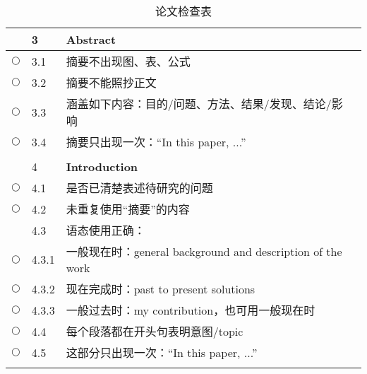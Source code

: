 \documentclass{ctexart}
\begin{document}
\begin{table}[h]
\begin{tabular}{|c|l|l|l|}
$ $ & 3 & \textcolor[rgb]{0.00,0.00,1.00}{\textbf{Abstract}}&\\\hline
$\bigcirc$ & 3.1 & 摘要不出现图、表、公式&\\\hline
$\bigcirc$ & 3.2 & 摘要不能照抄正文&\\\hline
$\bigcirc$ & 3.3 & 涵盖如下内容：目的/问题、方法、结果/发现、结论/影响&\\\hline
$\bigcirc$ & 3.4 & 摘要只出现一次：“In this paper, ...”&\\\hline
$ $&  &  &\\\hline

 & 4 & \textcolor[rgb]{0.00,0.00,1.00}{\textbf{Introduction}}&\\\hline
$\bigcirc$& 4.1 & 是否已清楚表述待研究的问题 &\\\hline
$\bigcirc$& 4.2 & 未重复使用“摘要”的内容 &\\\hline
$ $& 4.3 & 语态使用正确： &\\\hline
$\bigcirc$& 4.3.1 & 一般现在时：general background and description of the work &\\\hline
$\bigcirc$& 4.3.2 & 现在完成时：past to present solutions&\\\hline
$\bigcirc$& 4.3.3 & 一般过去时：my contribution，也可用一般现在时&\\\hline
$\bigcirc$& 4.4 & 每个段落都在开头句表明意图/topic &\\\hline
$\bigcirc$& 4.5 & 这部分只出现一次：“In this paper, ...” &\\\hline
$ $&  &  &\\\hline
\end{tabular}
\caption{论文检查表}\label{tab:4}
\end{table}
\end{document}

